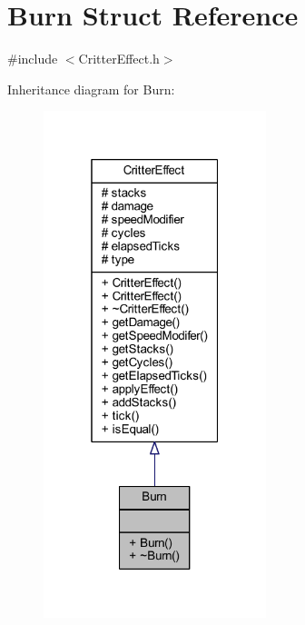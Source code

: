 \hypertarget{struct_burn}{\section{Burn Struct Reference}
\label{struct_burn}
}


{\ttfamily \#include $<$Critter\+Effect.\+h$>$}



Inheritance diagram for Burn\+:\nopagebreak
\begin{figure}[H]
\begin{center}
\leavevmode
\includegraphics[width=184pt]{struct_burn__inherit__graph}
\end{center}
\end{figure}


